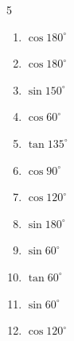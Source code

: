\begin{multicols}{5}
\begin{enumerate}
        \phantom{$\displaystyle =0$}

  \item $\displaystyle \cos{180^\circ}$

        \phantom{$\displaystyle =-1$}

  \item $\displaystyle \cos{180^\circ}$

        \phantom{$\displaystyle =-1$}

  \item $\displaystyle \sin{150^\circ}$


  \item $\displaystyle \cos{60^\circ}$


  \item $\displaystyle \tan{135^\circ}$

        \phantom{$\displaystyle =-1$}

  \item $\displaystyle \cos{90^\circ}$

        \phantom{$\displaystyle =0$}

  \item $\displaystyle \cos{120^\circ}$


  \item $\displaystyle \sin{180^\circ}$

        \phantom{$\displaystyle =0$}

  \item $\displaystyle \sin{60^\circ}$


  \item $\displaystyle \tan{60^\circ}$


  \item $\displaystyle \sin{60^\circ}$


  \item $\displaystyle \cos{120^\circ}$


\columnbreak %


\end{enumerate}
\end{multicols}
